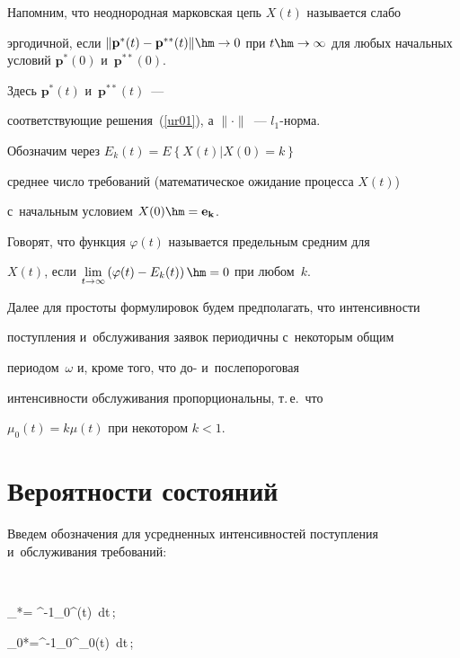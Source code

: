 Напомним, что неоднородная марковская цепь $X(t)$ называется слабо

эргодичной, если  $\|\mathbf{p}^*(t)-\mathbf{p}^{**}(t)\| \hm\to 0$ при $t

\hm\to \infty$ для любых начальных условий $\mathbf{p}^*(0)$ и~$\mathbf{p}^{**}(0)$. 

Здесь $\mathbf{p}^*(t)$ и~$\mathbf{p}^{**}(t)$~---

соответствующие решения~(\ref{ur01}), а $\|\cdot\|$~--- $l_1$-норма.



Обозначим через $E_k(t) = E\left\{X(t)\left|X(0)=k\right.\right\}$

среднее число требований (математическое ожидание процесса $X(t)$) 

с~начальным условием  $X(0)\hm=\mathbf{e}_{\mathbf{k}}$.





Говорят, что функция $\varphi (t)$ называется предельным средним для

$X(t)$, если  $\lim\limits_{t \to \infty }  \left(\varphi (t)

- E_k(t)\right) \hm= 0$ при любом~$k$.



Далее для простоты формулировок будем предполагать, что интенсивности

поступления и~обслуживания заявок периодичны с~некоторым общим

периодом~$\omega$ и, кроме того, что до- и~послепороговая

интенсивности обслуживания пропорциональны, т.\,е.\ что

$\mu_0(t)=k\mu(t)$ при некотором $k < 1$.



\section{Вероятности состояний}



Введем обозначения для усредненных интенсивностей поступления и~обслуживания требований:

$$

\mu_*= \omega^{-1}\int\limits_0^\omega \mu(t)\, dt\,; 

\quad 

\mu_{0*}=\omega^{-1}\int\limits_0^\omega \mu_0(t)\, dt\,; 

\quad 

